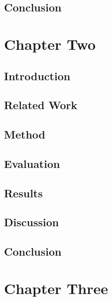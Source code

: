 \documentclass[letterpaper]{tandon_thesis}
\begin{document}
\section{Conclusion}\label{sec:ChapOneConclusion}


\chapter{Chapter Two}
\label{ch-2}

\section{Introduction}\label{sec:ChapTwoIntroduction}


\section{Related Work}\label{sec:ChapTwoMotivation}


\section{Method}\label{sec:ChapTwoMethod}


\section{Evaluation}\label{sec:ChapTwoEvaluation}


\section{Results}\label{sec:ChapTwoResults}


\section{Discussion}\label{sec:ChapTwoDiscussion}


\section{Conclusion}\label{sec:ChapTwoConclusion}


\chapter{Chapter Three}
\label{ch-3}
\end{document}
